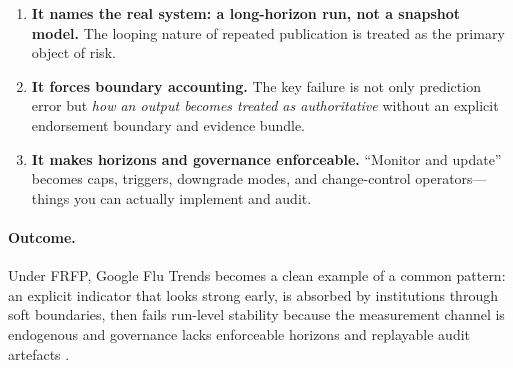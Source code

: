 \begin{enumerate}
  \item \textbf{It names the real system: a long-horizon run, not a snapshot model.}
        The looping nature of repeated publication is treated as the primary object of risk.

  \item \textbf{It forces boundary accounting.}
        The key failure is not only prediction error but \emph{how an output becomes treated as authoritative} without an explicit endorsement boundary and evidence bundle.

  \item \textbf{It makes horizons and governance enforceable.}
        “Monitor and update” becomes caps, triggers, downgrade modes, and change-control operators—things you can actually implement and audit.
\end{enumerate}

\paragraph{Outcome.}
Under FRFP, Google Flu Trends becomes a clean example of a common pattern: an explicit indicator that looks strong early, is absorbed by institutions through soft boundaries, then fails run-level stability because the measurement channel is endogenous and governance lacks enforceable horizons and replayable audit artefacts \cite{Lazer2014Science,Google2015NextChapterFluTrends}.
